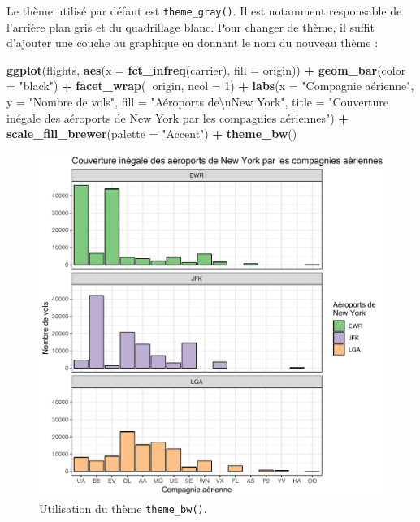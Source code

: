 \documentclass[a4paperpaper,]{article}
\newenvironment{Shaded}{\begin{snugshade}}{\end{snugshade}}
\newcommand{\KeywordTok}[1]{\textcolor[rgb]{0.13,0.29,0.53}{\textbf{#1}}}
\newcommand{\DataTypeTok}[1]{\textcolor[rgb]{0.13,0.29,0.53}{#1}}
\newcommand{\DecValTok}[1]{\textcolor[rgb]{0.00,0.00,0.81}{#1}}
\newcommand{\CharTok}[1]{\textcolor[rgb]{0.31,0.60,0.02}{#1}}
\newcommand{\StringTok}[1]{\textcolor[rgb]{0.31,0.60,0.02}{#1}}
\newcommand{\OperatorTok}[1]{\textcolor[rgb]{0.81,0.36,0.00}{\textbf{#1}}}
\newcommand{\NormalTok}[1]{#1}
\theoremstyle{definition}
\theoremstyle{definition}
\theoremstyle{definition}
\theoremstyle{remark}
\begin{document}
Le thème utilisé par défaut est \texttt{theme\_gray()}. Il est notamment
responsable de l'arrière plan gris et du quadrillage blanc. Pour changer
de thème, il suffit d'ajouter une couche au graphique en donnant le nom
du nouveau thème :

\begin{Shaded}
\begin{Highlighting}[]
\KeywordTok{ggplot}\NormalTok{(flights, }\KeywordTok{aes}\NormalTok{(}\DataTypeTok{x =} \KeywordTok{fct_infreq}\NormalTok{(carrier), }\DataTypeTok{fill =}\NormalTok{ origin)) }\OperatorTok{+}
\StringTok{  }\KeywordTok{geom_bar}\NormalTok{(}\DataTypeTok{color =} \StringTok{"black"}\NormalTok{) }\OperatorTok{+}
\StringTok{  }\KeywordTok{facet_wrap}\NormalTok{(}\OperatorTok{~}\NormalTok{origin, }\DataTypeTok{ncol =} \DecValTok{1}\NormalTok{) }\OperatorTok{+}
\StringTok{  }\KeywordTok{labs}\NormalTok{(}\DataTypeTok{x =} \StringTok{"Compagnie aérienne"}\NormalTok{,}
       \DataTypeTok{y =} \StringTok{"Nombre de vols"}\NormalTok{,}
       \DataTypeTok{fill =} \StringTok{"Aéroports de}\CharTok{\textbackslash{}n}\StringTok{New York"}\NormalTok{,}
       \DataTypeTok{title =} \StringTok{"Couverture inégale des aéroports de New York par les compagnies aériennes"}\NormalTok{) }\OperatorTok{+}
\StringTok{  }\KeywordTok{scale_fill_brewer}\NormalTok{(}\DataTypeTok{palette =} \StringTok{"Accent"}\NormalTok{) }\OperatorTok{+}
\StringTok{  }\KeywordTok{theme_bw}\NormalTok{()}
\end{Highlighting}
\end{Shaded}

\begin{figure}[htpb]

{\centering \includegraphics[width=0.9\linewidth]{figure/themebw-1} 

}

\caption{Utilisation du thème \texttt{theme\_bw()}.}\label{fig:themebw}
\end{figure}
\end{document}
